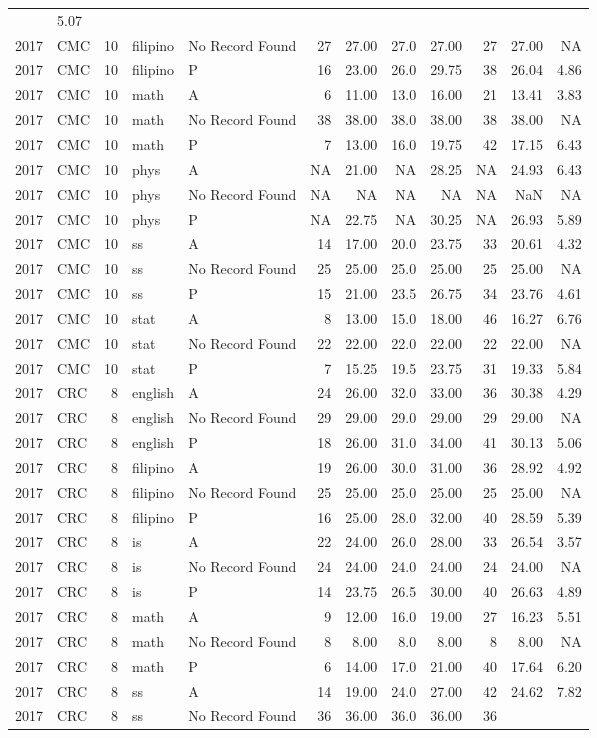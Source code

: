\documentclass[]{article}
\begin{document}
\begin{longtable}[]{@{}rlrllrrrrrrr@{}}
& 5.07\tabularnewline
2017 & CMC & 10 & filipino & No Record Found & 27 & 27.00 & 27.0 & 27.00
& 27 & 27.00 & NA\tabularnewline
2017 & CMC & 10 & filipino & P & 16 & 23.00 & 26.0 & 29.75 & 38 & 26.04
& 4.86\tabularnewline
2017 & CMC & 10 & math & A & 6 & 11.00 & 13.0 & 16.00 & 21 & 13.41 &
3.83\tabularnewline
2017 & CMC & 10 & math & No Record Found & 38 & 38.00 & 38.0 & 38.00 &
38 & 38.00 & NA\tabularnewline
2017 & CMC & 10 & math & P & 7 & 13.00 & 16.0 & 19.75 & 42 & 17.15 &
6.43\tabularnewline
2017 & CMC & 10 & phys & A & NA & 21.00 & NA & 28.25 & NA & 24.93 &
6.43\tabularnewline
2017 & CMC & 10 & phys & No Record Found & NA & NA & NA & NA & NA & NaN
& NA\tabularnewline
2017 & CMC & 10 & phys & P & NA & 22.75 & NA & 30.25 & NA & 26.93 &
5.89\tabularnewline
2017 & CMC & 10 & ss & A & 14 & 17.00 & 20.0 & 23.75 & 33 & 20.61 &
4.32\tabularnewline
2017 & CMC & 10 & ss & No Record Found & 25 & 25.00 & 25.0 & 25.00 & 25
& 25.00 & NA\tabularnewline
2017 & CMC & 10 & ss & P & 15 & 21.00 & 23.5 & 26.75 & 34 & 23.76 &
4.61\tabularnewline
2017 & CMC & 10 & stat & A & 8 & 13.00 & 15.0 & 18.00 & 46 & 16.27 &
6.76\tabularnewline
2017 & CMC & 10 & stat & No Record Found & 22 & 22.00 & 22.0 & 22.00 &
22 & 22.00 & NA\tabularnewline
2017 & CMC & 10 & stat & P & 7 & 15.25 & 19.5 & 23.75 & 31 & 19.33 &
5.84\tabularnewline
2017 & CRC & 8 & english & A & 24 & 26.00 & 32.0 & 33.00 & 36 & 30.38 &
4.29\tabularnewline
2017 & CRC & 8 & english & No Record Found & 29 & 29.00 & 29.0 & 29.00 &
29 & 29.00 & NA\tabularnewline
2017 & CRC & 8 & english & P & 18 & 26.00 & 31.0 & 34.00 & 41 & 30.13 &
5.06\tabularnewline
2017 & CRC & 8 & filipino & A & 19 & 26.00 & 30.0 & 31.00 & 36 & 28.92 &
4.92\tabularnewline
2017 & CRC & 8 & filipino & No Record Found & 25 & 25.00 & 25.0 & 25.00
& 25 & 25.00 & NA\tabularnewline
2017 & CRC & 8 & filipino & P & 16 & 25.00 & 28.0 & 32.00 & 40 & 28.59 &
5.39\tabularnewline
2017 & CRC & 8 & is & A & 22 & 24.00 & 26.0 & 28.00 & 33 & 26.54 &
3.57\tabularnewline
2017 & CRC & 8 & is & No Record Found & 24 & 24.00 & 24.0 & 24.00 & 24 &
24.00 & NA\tabularnewline
2017 & CRC & 8 & is & P & 14 & 23.75 & 26.5 & 30.00 & 40 & 26.63 &
4.89\tabularnewline
2017 & CRC & 8 & math & A & 9 & 12.00 & 16.0 & 19.00 & 27 & 16.23 &
5.51\tabularnewline
2017 & CRC & 8 & math & No Record Found & 8 & 8.00 & 8.0 & 8.00 & 8 &
8.00 & NA\tabularnewline
2017 & CRC & 8 & math & P & 6 & 14.00 & 17.0 & 21.00 & 40 & 17.64 &
6.20\tabularnewline
2017 & CRC & 8 & ss & A & 14 & 19.00 & 24.0 & 27.00 & 42 & 24.62 &
7.82\tabularnewline
2017 & CRC & 8 & ss & No Record Found & 36 & 36.00 & 36.0 & 36.00 & 36 &

\end{longtable}
\end{document}
